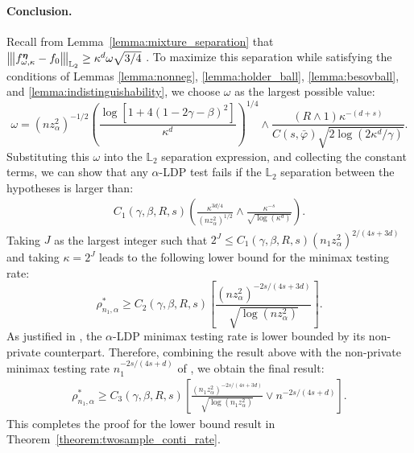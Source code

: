 \documentclass[twoside,11pt]{article}
\newcommand{\Ell}{\mathbb{L}}
\newcommand{\EllTwo}{\Ell_2} %
\newcommand{\vertiii}[1]{
	{\left\vert\kern-0.25ex\left\vert\kern-0.25ex\left\vert #1 
		\right\vert\kern-0.25ex\right\vert\kern-0.25ex\right\vert}
}%
\newcommand{\dimDensity}{d} %
\newcommand{\sampleSize}{n}
\newcommand{\smoothness}{s}
\newcommand{\privacyParameter}{\alpha} %
\newcommand{\maxErrorTypeTwo}{\beta} %
\newcommand{\maxErrorTypeOne}{\gamma} %
\newcommand{\binNum}{\kappa}           %
\begin{document}
\begin{appendix}
	\paragraph{Conclusion.}
	Recall from Lemma~\ref{lemma:mixture_separation} that $\vertiii{ f^{{\boldsymbol{\eta}}}_{\omega, \binNum}- f_0}_{\mathbb{L}_2}
	\geq
	\binNum^{\dimDensity} \omega \sqrt{
		3/4}$ .
	To maximize this separation while satisfying the conditions of Lemmas \ref{lemma:nonneg}, \ref{lemma:holder_ball}, \ref{lemma:besovball}, and \ref{lemma:indistinguishability}, we choose $\omega$ as the largest possible value:
	\begin{equation*}
		\omega 
		= 
		(n z_\privacyParameter^2)^{-1/2}
		\left(
		\frac{\log \left[ 1 + 4(1- 2\gamma - \beta)^2\right]}{\binNum^{\dimDensity}}
		\right)^{1/4}
		\wedge
		\frac{(R \wedge 1)\kappa^{-(\dimDensity + \smoothness)}
		}{
			C(\smoothness, \bar{\varphi}) 
			\sqrt{2 \log({2 \binNum^{\dimDensity}}/\gamma)}}.
	\end{equation*}
	Substituting this $\omega$ into the $\EllTwo$ separation expression, and collecting the constant terms, 
	we can show that any $\privacyParameter$-LDP test fails if the $\EllTwo$ separation between the hypotheses is larger than:
	\begin{align*}
		C_1(\maxErrorTypeOne, \maxErrorTypeTwo, R, \smoothness)
		\left(
		\frac{\binNum^{3\dimDensity/4}
		}{(n z_\privacyParameter^2)^{1/2}}
		\wedge  
		\frac{\kappa^{-s}
		}{
			\sqrt{ \log({ \binNum^{\dimDensity}})}}
		\right).
	\end{align*}
	Taking $J$ as the largest integer such that
	$2^J \leq C_1(\gamma, \beta, R, \smoothness)(\sampleSize_1 z_\privacyParameter^2)^{2/(4\smoothness+3\dimDensity)}$ 
	and taking $\binNum = 2^J$ leads to the following lower bound for the minimax testing rate:
	\begin{equation*}
		\rho_{\sampleSize_1, \privacyParameter}^\ast
		\geq
		C_2(\gamma, \beta, R, \smoothness)
		\left[
		\frac{
			(n z_\privacyParameter^2)^{
				-2s/(4\smoothness+3\dimDensity)        }
		}{
			\sqrt{
				\log(n z_\privacyParameter^2)
			}
		}\right].
	\end{equation*}
	As justified in \citet{Lam-Weil2021MinimaxConstraint}, the $\privacyParameter$-LDP 
	minimax testing rate is lower bounded by its non-private counterpart.
	Therefore, combining the result above with the non-private minimax testing rate $\sampleSize_1^{
		-2s/(4s + \dimDensity)
	}$ of \citet{Arias-Castro2018RememberDimension},
	we obtain the final result:
	\begin{align*}
		\rho_{\sampleSize_1, \privacyParameter}^\ast
		\geq
		C_3(\gamma, \beta, R, \smoothness)
		\left[
		\frac{
			(\sampleSize_1 z_\privacyParameter^2)^{
				-2s/(4\smoothness+3\dimDensity)        }
		}{
			\sqrt{
				\log(\sampleSize_1 z_\privacyParameter^2)
			}
		}
		\vee
		n^{
			-2s/(4s + \dimDensity)
		}
		\right].
	\end{align*}
	This completes the proof for the lower bound result in Theorem~\ref{theorem:twosample_conti_rate}.

\end{appendix}
\end{document}
